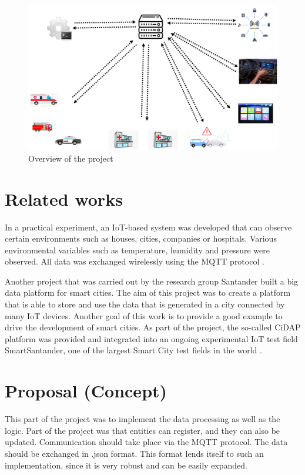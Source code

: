 \begin{figure}
\sidecaption
\includegraphics[scale=0.4]{images/walter/uebersicht.png}
\caption{Overview of the project \cite{rettberg_2020}}
\label{overview}
\end{figure}



\section{Related works}
\label{sec:2}

In a practical experiment, an IoT-based system was developed that can observe certain environments such as houses, cities, companies or hospitals. Various environmental variables such as temperature, humidity and pressure were observed. All data was exchanged wirelessly using the MQTT protocol \cite{smartCity}.

Another project that was carried out by the research group Santander built a big data platform for smart cities. The aim of this project was to create a platform that is able to store and use the data that is generated in a city connected by many IoT devices. Another goal of this work is to provide a good example to drive the development of smart cities. 
As part of the project, the so-called CiDAP platform was provided and integrated into an ongoing experimental IoT test field SmartSantander, one of the largest Smart City test fields in the world \cite{santander}.


\section{Proposal (Concept)}
\label{sec:3}

This part of the project was to implement the data processing as well as the logic. Part of the project was that entities can register, and they can also be updated. Communication should take place via the MQTT protocol. The data should be exchanged in .json format. This format lends itself to such an implementation, since it is very robust and can be easily expanded. 

